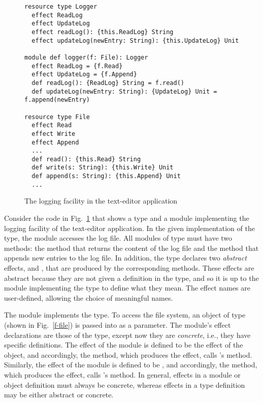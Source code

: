 \begin{figure}
\begin{lstlisting}
resource type Logger
  effect ReadLog
  effect UpdateLog
  effect readLog(): {this.ReadLog} String
  effect updateLog(newEntry: String): {this.UpdateLog} Unit

module def logger(f: File): Logger
  effect ReadLog = {f.Read}
  effect UpdateLog = {f.Append}
  def readLog(): {ReadLog} String = f.read()
  def updateLog(newEntry: String): {UpdateLog} Unit = f.append(newEntry)
  
resource type File
  effect Read
  effect Write
  effect Append
  ...
  def read(): {this.Read} String
  def write(s: String): {this.Write} Unit
  def append(s: String): {this.Append} Unit
  ...
\end{lstlisting}

\caption{The logging facility in the text-editor application}
\label{fig-logging}
\end{figure}

Consider the code in Fig.~\ref{fig-logging} that shows a type and a module implementing the logging facility of the text-editor application.  In the given implementation of the  type, the  module accesses the log file. All modules of type  must have two methods: the  method that returns the content of the log file and the  method that appends new entries to the log file. In addition, the  type declares two \textit{abstract} effects,  and , that are produced by the corresponding methods. These effects are abstract because they are not given a definition in the  type, and so it is up to the module implementing the  type to define what they mean. The effect names are user-defined, allowing the choice of meaningful names. 

The  module implements the  type. To access the file system, an object of type  (shown in Fig.~\ref{f-file}) is passed into  as a parameter. The  module's effect declarations are those of the  type, except now they are \textit{concrete}, i.e., they have specific definitions. The  effect of the  module is defined to be the  effect of the  object, and accordingly, the  method, which produces the  effect, calls 's  method. Similarly, the  effect of the  module is defined to be , and accordingly, the  method, which produces the  effect, calls 's  method. In general, effects in a module or object definition must always be concrete, whereas effects in a type definition may be either abstract or concrete.

